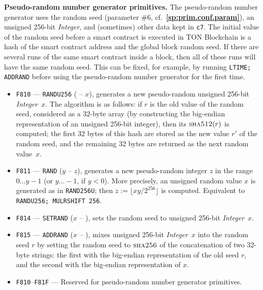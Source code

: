 \documentclass[12pt,oneside]{article}
\def\makepoint#1{\medbreak\noindent{\bf #1.\ }}
\def\nxsubpoint{\refstepcounter{subsubsection}%
    \smallbreak\makepoint{\thesubsubsection}}
\def\refpoint#1{{\rm\textbf{\ref{#1}}}}
\let\ptref=\refpoint
\def\emb#1{\textbf{#1.}}
\def\opsc#1{\operatorname{\textsc{#1}}}
\def\Sha{\opsc{sha256}}
\begin{document}
\nxsubpoint\emb{Pseudo-random number generator primitives}
The pseudo-random number generator uses the random seed (parameter \#6, cf.~\ptref{sp:prim.conf.param}), an unsigned 256-bit {\em Integer}, and (sometimes) other data kept in {\tt c7}. The initial value of the random seed before a smart contract is executed in TON Blockchain is a hash of the smart contract address and the global block random seed. If there are several runs of the same smart contract inside a block, then all of these runs will have the same random seed. This can be fixed, for example, by running {\tt LTIME; ADDRAND} before using the pseudo-random number generator for the first time.
\begin{itemize}
\item {\tt F810} --- {\tt RANDU256} ( -- $x$), generates a new pseudo-random unsigned 256-bit {\em Integer}~$x$. The algorithm is as follows: if $r$ is the old value of the random seed, considered as a 32-byte array (by constructing the big-endian representation of an unsigned 256-bit integer), then its $\opsc{sha512}(r)$ is computed; the first 32 bytes of this hash are stored as the new value $r'$ of the random seed, and the remaining 32 bytes are returned as the next random value~$x$.
\item {\tt F811} --- {\tt RAND} ($y$ -- $z$), generates a new pseudo-random integer $z$ in the range $0\ldots y-1$ (or $y\ldots-1$, if $y<0$). More precisely, an unsigned random value $x$ is generated as in {\tt RAND256U}; then $z:=\lfloor xy/2^{256}\rfloor$ is computed. Equivalent to {\tt RANDU256; MULRSHIFT 256}.
\item {\tt F814} --- {\tt SETRAND} ($x$ -- ), sets the random seed to unsigned 256-bit {\em Integer\/}~$x$.
\item {\tt F815} --- {\tt ADDRAND} ($x$ -- ), mixes unsigned 256-bit {\em Integer\/}~$x$ into the random seed $r$ by setting the random seed to $\Sha$ of the concatenation of two 32-byte strings: the first with the big-endian representation of the old seed $r$, and the second with the big-endian representation of $x$.
\item {\tt F810}--{\tt F81F} --- Reserved for pseudo-random number generator primitives.
\end{itemize}
\end{document}
